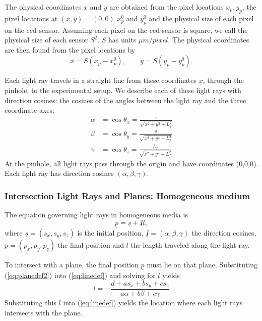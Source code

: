 \documentclass[smallextended]{svjour3}       %
\begin{document}
The physical coordinates $x$ and $y$ are obtained from the pixel locations $x_p, y_p$, the pixel locations at $(x,y)=(0,0)$ $x_p^0$ and $y_p^0$ and the physical size of each pixel on the ccd-sensor. Assuming each pixel on the ccd-sensor is square, we call the physical size of each sensor $S^2$. $S$ has units $\mu m/pixel$. The physical coordinates are then found from the pixel locations by
\begin{equation}
	x = S (x_p-x_p^0), \qquad  y = S (y_p-y_p^0).
\end{equation}

Each light ray travels in a straight line from these coordinates $\underline{x}$, through the pinhole, to the experimental setup. We describe each of these light rays with direction cosines: the cosines of the angles between the light ray and the three coordinate axes:
\begin{align}
\label{eq:directioncosines}
	\alpha &= \cos \theta_x = \frac{x}{\sqrt{x^2+y^2+L_f^2}} \nonumber \\
	\beta &= \cos \theta_y = \frac{y}{\sqrt{x^2+y^2+L_f^2}} \\
	\gamma &= \cos \theta_z = \frac{L_f}{\sqrt{x^2+y^2+L_f^2}} \nonumber
\end{align}
At the pinhole, all light rays pass through the origin and have coordinates (0,0,0). Each light ray has direction cosines $(\alpha, \beta, \gamma)$.

\subsubsection{Intersection Light Rays and Planes: Homogeneous medium}
The equation governing light rays in homogeneous media is
\begin{equation}
	\label{eq:linedef}
   \underline{p} = \underline{s} + \underline{I} l,
\end{equation}
where $\underline{s} = (s_x, s_y, s_z)$ is the initial position, $\underline{I} = (\alpha, \beta, \gamma)$ the direction cosines, $p = (p_x, p_y, p_z)$ the final position and $l$ the length traveled along the light ray. %

To intersect with a plane, the final position $\underline{p}$ must lie on that plane. Substituting (\ref{eq:planedef2}) into (\ref{eq:linedef}) and solving for $l$ yields 
\begin{equation}
	l = - \frac{d + a s_x + b s_y + c s_z}{a \alpha + b \beta + c \gamma}
\end{equation}
Substituting this $l$ into (\ref{eq:linedef}) yields the location where each light rays intersects with the plane.
\end{document}
